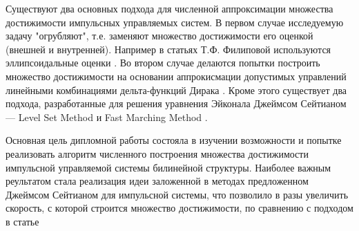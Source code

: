 Существуют два основных подхода для численной аппроксимации множества
достижимости импульсных управляемых систем. В первом случае
исследуемую задачу "огрубляют", т.е. заменяют множество достижимости
его оценкой (внешней и внутренней). Например в статьях Т.Ф. Филиповой
используются эллипсоидальные оценки \cite{FM2011}. Во втором случае
делаются попытки построить множество достижимости на основании
аппрокисмации допустимых управлений линейными комбинациями
дельта-функций Дирака \cite{BS2005}. Кроме этого существует два
подхода, разработанные для решения уравнения Эйконала Джеймсом
Сейтианом --- Level Set Method и Fast Marching Method \cite{S1999}.

Основная цель дипломной работы состояла в изучении возможности и
попытке реализовать алгоритм численного построения множества
достижимости импульсной управляемой системы билинейной
структуры. Наиболее важным реультатом стала реализация идеи заложенной
в методах предложенном Джеймсом Сейтианом \cite{S1999} для импульсной
системы, что позволило в разы увеличить скорость, с которой строится
множество достижимости, по сравнению с подходом в статье \cite{BS2005}



